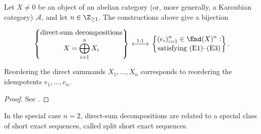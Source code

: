 \begin{proposition}\label{prop:idempotent-decomposition}
	Let $X\neq0$ be an object of an abelian category (or, more generally, a
	Karoubian category) $\mathcal{A}$, and let $n\in\Z_{\geq1}$. The
	constructions above give a bijection
	\[\begin{tikzcd}[row sep=small]
		\left\{\begin{gathered}
			\text{direct-sum decompositions}\\[-2pt]
			X = \bigoplus_{i=1}^n X_i
		\end{gathered}\right\}
		\arrow[leftrightarrow, r, "1:1"] &
		\left\{\begin{gathered}
			(e_i)_{i=1}^n \in \End(X)^n:\\[-2pt]
			\text{satisfying (E1)--(E3)}
		\end{gathered}\right\}.
	\end{tikzcd}\]
	Reordering the direct summands $X_1,\ldots,X_n$ corresponds to reordering
	the idempotents $e_1,\ldots,e_n$.
\end{proposition}
\begin{proof}
	See \cite[Proposition 6.12.4]{Li1}.
\end{proof}

In the special case $n=2$, direct-sum decompositions are related to a special
class of short exact sequences, called split short exact sequences.

